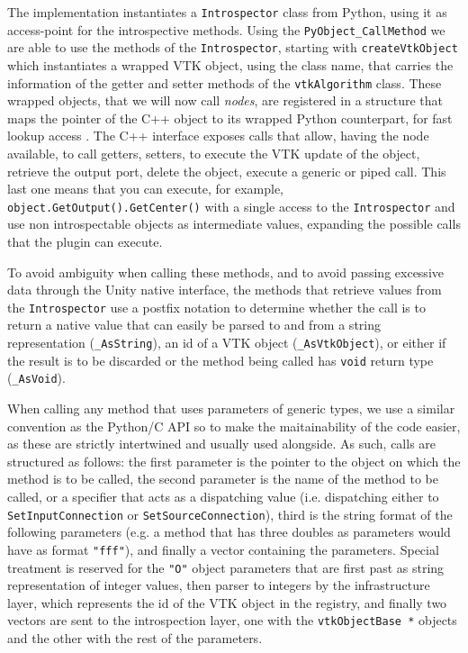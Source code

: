 The implementation instantiates a \verb|Introspector| class from Python, using it as access-point for the introspective methods. Using the \verb|PyObject_CallMethod| we are able to use the methods of the \verb|Introspector|, starting with \verb|createVtkObject| which instantiates a wrapped VTK object, using the class name, that carries the information of the getter and setter methods of the \verb|vtkAlgorithm| class. These wrapped objects, that we will now call \textit{nodes}, are registered in a structure that maps the pointer of the C++ object to its wrapped Python counterpart, for fast lookup access \cite{stdunord16}. The C++ interface exposes calls that allow, having the node available, to call getters, setters, to execute the VTK update of the object, retrieve the output port, delete the object, execute a generic or piped call. This last one means that you can execute, for example, \verb|object.GetOutput().GetCenter()| with a single access to the \verb|Introspector| and use non introspectable objects as intermediate values, expanding the possible calls that the plugin can execute.

To avoid ambiguity when calling these methods, and to avoid passing excessive data through the Unity native interface, the methods that retrieve values from the \verb|Introspector| use a postfix notation to determine whether the call is to return a native value that can easily be parsed to and from a string representation (\verb|_AsString|), an id of a VTK object (\verb|_AsVtkObject|), or either if the result is to be discarded or the method being called has \verb|void| return type (\verb|_AsVoid|).

When calling any method that uses parameters of generic types, we use a similar convention as the Python/C API so to make the maitainability of the code easier, as these are strictly intertwined and usually used alongside. As such, calls are structured as follows: the first parameter is the pointer to the object on which the method is to be called, the second parameter is the name of the method to be called, or a specifier that acts as a dispatching value (i.e. dispatching either to \verb|SetInputConnection| or \verb|SetSourceConnection|), third is the string format of the following parameters (e.g. a method that has three doubles as parameters would have as format \verb|"fff"|), and finally a vector containing the parameters. Special treatment is reserved for the \verb|"O"| object parameters that are first past as string representation of integer values, then parser to integers by the infrastructure layer, which represents the id of the VTK object in the registry, and finally two vectors are sent to the introspection layer, one with the \verb|vtkObjectBase *| objects and the other with the rest of the parameters.

